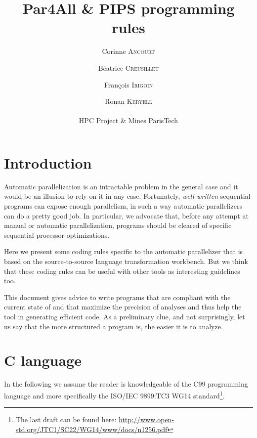 \documentclass[a4paper]{article}
\begin{document}
\title{Par4All \& PIPS programming rules}

\author{Corinne \textsc{Ancourt} \and Béatrice \textsc{Creusillet} \and
  François \textsc{Irigoin} \and Ronan \textsc{Keryell}\\
  ---\\
  HPC Project \& Mines ParisTech}

\maketitle

\tableofcontents{}



\section{Introduction}
\label{sec:introduction}

Automatic parallelization is an intractable problem in the general
case and it would be an illusion to rely on it in any
case. Fortunately, \emph{well written} sequential programs can expose
enough parallelism, in such a way automatic parallelizers can do a
pretty good job. In particular, we advocate that, before any attempt
at manual or automatic parallelization, programs should be cleared of
specific sequential processor optimizations.

Here we present some coding rules specific to the \Apfa automatic
parallelizer that is based on the \Apips source-to-source language
transformation workbench. But we think that these coding rules can be
useful with other tools as interesting guidelines too.

This document gives advice to write programs that are compliant with the
current state of \Apips and that maximize the precision of analyses and
thus help the tool in generating efficient code. As a preliminary clue,
and not surprisingly, let us say that the more structured a program is,
the easier it is to analyze.


\section{C language}
\label{sec:c-language}

In the following we assume the reader is knowledgeable of the C99
programming language and more specifically the ISO/IEC 9899:TC3 WG14
standard\footnote{The last draft can be found here:
  \url{http://www.open-std.org/JTC1/SC22/WG14/www/docs/n1256.pdf}}.
\end{document}
